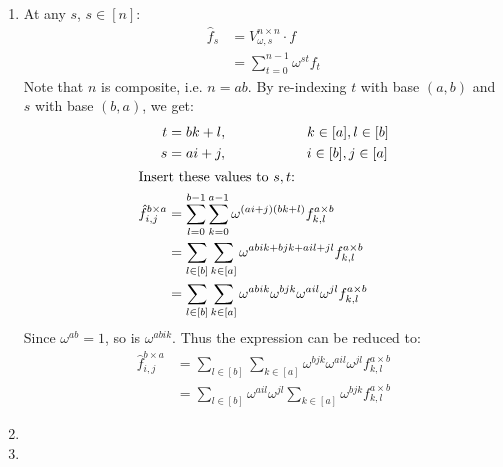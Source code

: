 \documentclass[11pt,a4paper]{article}
\begin{document}
\begin{enumerate}
          \newpage

    \item At any $s$, $s \in [n]$:
          \begin{align*}
              \hat{f}_{s} & = V_{\omega, s}^{n \times n} \cdot f  \\
                          & = \sum_{t = 0}^{n - 1} \omega^{st}f_t
          \end{align*}
          Note that $n$ is composite, i.e. $n = ab$.
          By re-indexing $t$ with base $(a, b)$ and $s$ with base $(b, a)$, we get:
          \begin{align*}
              t                           & = bk + l, \hspace{2cm} k \in [a], l \in [b]                                                                   \\
              s                           & = ai + j, \hspace{2cm} i \in [b], j \in [a]                                                                   \\
              \intertext{Insert these values to $s, t$:}
              \hat{f}^{b \times a}_{i, j} & = \sum_{l = 0}^{b - 1} \sum_{k = 0}^{a - 1} \omega^{(ai + j)(bk + l)} f_{k, l}^{a \times b}                   \\
                                          & = \sum_{l \in [b]} \sum_{k \in [a]} \omega^{abik + bjk + ail + jl} f_{k, l}^{a \times b}                      \\
                                          & = \sum_{l \in [b]} \sum_{k \in [a]} \omega^{abik} \omega^{bjk} \omega^{ail} \omega^{jl} f_{k, l}^{a \times b}
          \end{align*}
          Since $\omega^{ab} = 1$, so is $\omega^{abik}$. Thus the expression can be reduced to:
          \begin{align*}
              \hat{f}_{i, j}^{b \times a} & = \sum_{l \in [b]} \sum_{k \in [a]} \omega^{bjk}\omega^{ail}\omega^{jl}  f_{k, l}^{a \times b} \\
                                          & = \sum_{l \in [b]} \omega^{ail}\omega^{jl} \sum_{k \in [a]} \omega^{bjk} f_{k, l}^{a \times b}
          \end{align*}

          \newpage

    \item

          \newpage

    \item

          \newpage
\end{enumerate}
\end{document}
